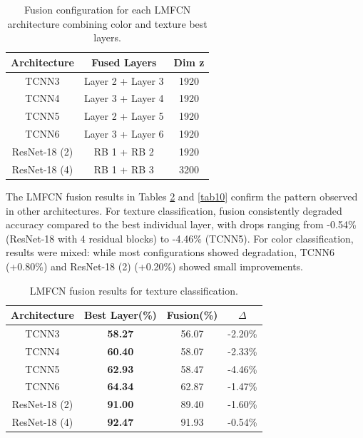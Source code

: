 \documentclass[conference]{IEEEtran}
\begin{document}
\begin{table}[htbp]
\caption{Fusion configuration for each LMFCN architecture combining color and texture best layers.}
\begin{center}
\begin{tabular}{c|c|c}
\hline
\textbf{Architecture} & \textbf{Fused Layers} & \textbf{Dim z}\\
\hline
TCNN3 & Layer 2 + Layer 3 & 1920 \\

TCNN4 & Layer 3 + Layer 4 & 1920 \\

TCNN5 & Layer 2 + Layer 5 & 1920 \\

TCNN6 & Layer 3 + Layer 6 & 1920 \\

ResNet-18 (2) & RB 1 + RB 2 & 1920 \\

ResNet-18 (4) & RB 1 + RB 3 & 3200 \\
\hline
\end{tabular}
\label{tab8}
\end{center}
\end{table}

The LMFCN fusion results in Tables \ref{tab9} and \ref{tab10} confirm the pattern observed in other architectures. For texture classification, fusion consistently degraded accuracy compared to the best individual layer, with drops ranging from -0.54\% (ResNet-18 with 4 residual blocks) to -4.46\% (TCNN5). For color classification, results were mixed: while most configurations showed degradation, TCNN6 (+0.80\%) and ResNet-18 (2) (+0.20\%) showed small improvements.


\begin{table}[htbp]
\caption{LMFCN fusion results for texture classification.}
\begin{center}
\begin{tabular}{c|c|c|c}
\hline
\textbf{Architecture} & \textbf{Best Layer(\%)} & \textbf{Fusion(\%)} & \textbf{$\Delta$}\\
\hline
TCNN3 & \textbf{58.27} & 56.07 & -2.20\% \\
TCNN4 & \textbf{60.40} & 58.07 & -2.33\% \\
TCNN5 & \textbf{62.93} & 58.47 & -4.46\% \\
TCNN6 & \textbf{64.34} & 62.87 & -1.47\% \\
ResNet-18 (2) & \textbf{91.00} & 89.40 & -1.60\% \\
ResNet-18 (4) & \textbf{92.47} & 91.93 & -0.54\% \\
\hline
\end{tabular}
\label{tab9}
\end{center}
\end{table}
\end{document}
